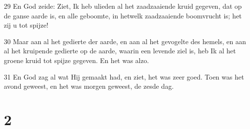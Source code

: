 \par 29 En God zeide: Ziet, Ik heb ulieden al het zaadzaaiende kruid gegeven, dat op de ganse aarde is, en alle geboomte, in hetwelk zaadzaaiende boomvrucht is; het zij u tot spijze!
\par 30 Maar aan al het gedierte der aarde, en aan al het gevogelte des hemels, en aan al het kruipende gedierte op de aarde, waarin een levende ziel is, heb Ik al het groene kruid tot spijze gegeven. En het was alzo.
\par 31 En God zag al wat Hij gemaakt had, en ziet, het was zeer goed. Toen was het avond geweest, en het was morgen geweest, de zesde dag.

\chapter{2}

